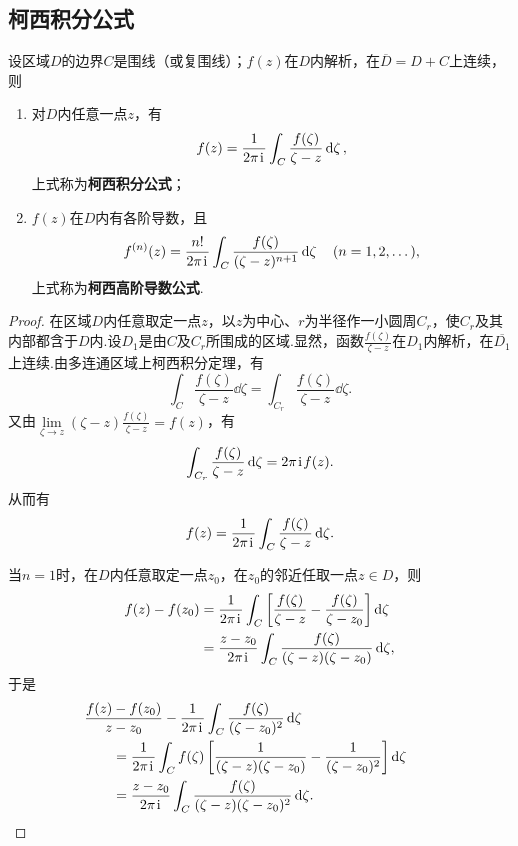 \subsection{柯西积分公式}
\begin{theorem}\label{theorem:解析函数的积分表示.柯西积分公式}
设区域\(D\)的边界\(C\)是围线（或复围线）；\(f(z)\)在\(D\)内解析，在\(\overline{D}=D+C\)上连续，则\begin{enumerate}
\item 对\(D\)内任意一点\(z\)，有\begin{equation}\label{equation:解析函数的积分表示.柯西积分公式}
f(z) = \frac{1}{2\pi\kern1pt\mathrm{i}\kern1pt} \int_C \frac{f(\zeta)}{\zeta-z} \dd{\zeta},
\end{equation}上式称为\textbf{柯西积分公式}；
\item \(f(z)\)在\(D\)内有各阶导数，且\begin{equation}\label{equation:解析函数的积分表示.柯西高阶导数公式}
f^{(n)}(z) = \frac{n!}{2\pi\kern1pt\mathrm{i}\kern1pt} \int_C \frac{f(\zeta)}{(\zeta-z)^{n+1}} \dd{\zeta} \quad (n=1,2,\dots),
\end{equation}上式称为\textbf{柯西高阶导数公式}.
\end{enumerate}
\begin{proof}
在区域\(D\)内任意取定一点\(z\)，以\(z\)为中心、\(r\)为半径作一小圆周\(C_r\)，使\(C_r\)及其内部都含于\(D\)内.设\(D_1\)是由\(C\)及\(C_r\)所围成的区域.显然，函数\(\frac{f(\zeta)}{\zeta-z}\)在\(D_1\)内解析，在\(\overline{D_1}\)上连续.由多连通区域上柯西积分定理，有\[
\int_C{\frac{f(\zeta)}{\zeta-z}\dd{\zeta}}
= \int_{C_r}{\frac{f(\zeta)}{\zeta-z}\dd{\zeta}}.
\]又由\(\lim\limits_{\zeta \to z} (\zeta-z) \frac{f(\zeta)}{\zeta-z} = f(z)\)，有\[
\int_{C_r}{\frac{f(\zeta)}{\zeta-z}\dd{\zeta}} = 2\pi\kern1pt\mathrm{i}\kern1pt f(z).
\]从而有\[
f(z) = \frac{1}{2\pi\kern1pt\mathrm{i}\kern1pt} \int_C{\frac{f(\zeta)}{\zeta-z}\dd{\zeta}}.
\]

当\(n=1\)时，在\(D\)内任意取定一点\(z_0\)，在\(z_0\)的邻近任取一点\(z \in D\)，则\begin{align*}
f(z)-f(z_0)
&= \frac{1}{2\pi\kern1pt\mathrm{i}\kern1pt} \int_C{\left[\frac{f(\zeta)}{\zeta-z}-\frac{f(\zeta)}{\zeta-z_0}\right]\dd{\zeta}} \\
&= \frac{z-z_0}{2\pi\kern1pt\mathrm{i}\kern1pt} \int_C{\frac{f(\zeta)}{(\zeta-z)(\zeta-z_0)}\dd{\zeta}},
\end{align*}
于是\begin{align*}
&\hspace{-20pt}\frac{f(z)-f(z_0)}{z-z_0} - \frac{1}{2\pi\iu} \int_C{\frac{f(\zeta)}{(\zeta-z_0)^2} \dd{\zeta}} \\
&=\frac{1}{2\pi\iu} \int_C{f(\zeta) \left[\frac{1}{(\zeta-z)(\zeta-z_0)}-\frac{1}{(\zeta-z_0)^2}\right]\dd{\zeta}} \\
&=\frac{z-z_0}{2\pi\iu} \int_C{\frac{f(\zeta)}{(\zeta-z)(\zeta-z_0)^2}\dd{\zeta}}.
\end{align*}


\end{proof}
\end{theorem}
